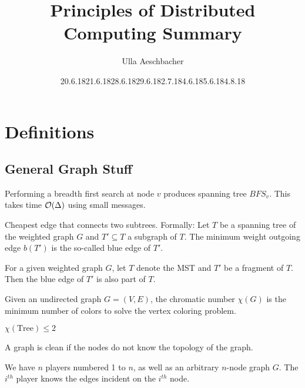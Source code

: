 \documentclass[11pt, oneside]{book}   						%
\title{Principles of Distributed Computing Summary}
\author{Ulla Aeschbacher}
\date{20.6.18}				%
\date{21.6.18}				%
\date{28.6.18}				%
\date{29.6.18}				%
\date{2.7.18}				%
\date{4.6.18}				%
\date{5.6.18}				%
\date{4.8.18}				%
\begin{document}
\maketitle

\tableofcontents

\listoftheorems[ignoreall, show={mythm}]
\renewcommand{}
\listoftheorems[ignoreall, show={mydef}]
\listofalgorithms

\chapter{Definitions}
\section{General Graph Stuff}
\begin{mydef}[$BFS_v$] Performing a breadth first search at node $v$ produces spanning tree $BFS_v$. This takes time $\mathcal{O}(\Delta)$ using small messages.\end{mydef}
\begin{mydef} Cheapest edge that connects two subtrees. Formally:  Let $T$ be a spanning tree of the weighted graph $G$ and $T'\subseteq T$ a subgraph of $T$. The minimum weight outgoing edge $b(T')$ is the so-called blue edge of $T'$.\end{mydef}
\begin{mythm}For a given weighted graph $G$, let $T$ denote the MST and $T'$ be a fragment of $T$. Then the blue edge of $T'$ is also part of $T$.\end{mythm}
\begin{mydef} Given an undirected graph $G=(V,E)$, the chromatic number $\chi(G)$ is the minimum number of colors to solve the vertex coloring problem.\end{mydef}
\begin{mythm}$\chi(\text{Tree}) \le 2$\end{mythm}
\begin{mydef}[Clean] A graph is clean if the nodes do not know the topology of the graph.\end{mydef}
\begin{mydef} We have $n$ players numbered 1 to $n$, as well as an arbitrary $n$-node graph $G$. The $i^{th}$ player knows the edges incident on the $i^{th}$ node. \end{mydef}
\end{document}
